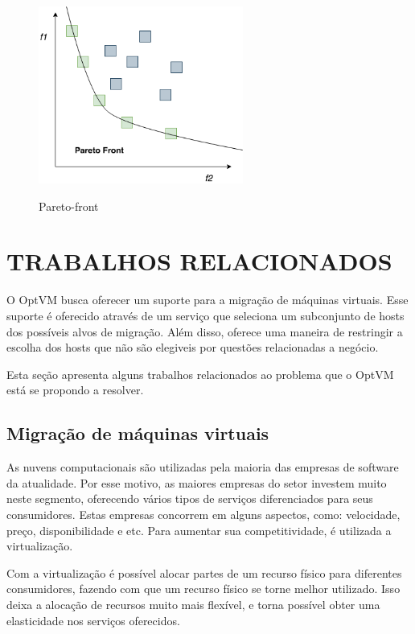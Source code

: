 \begin{figure}[!htb]
  \centering
  \caption{Pareto-front}
  \includegraphics[width=0.6\textwidth]{./dados/figuras/pareto-front.png}
  \label{fig:paretofront}
\end{figure}

\section{TRABALHOS RELACIONADOS}
O OptVM busca oferecer um suporte para a migração de máquinas virtuais. Esse
suporte é oferecido através de um serviço que seleciona um subconjunto de hosts 
dos possíveis alvos de migração. Além disso, oferece uma maneira de restringir
a escolha dos hosts que não são elegiveis por questões relacionadas a negócio.

Esta seção apresenta alguns trabalhos relacionados ao problema que o OptVM está
se propondo a resolver.

\subsection{Migração de máquinas virtuais}
As nuvens computacionais são utilizadas pela maioria das empresas de software da atualidade. 
Por esse motivo, as maiores empresas do setor investem muito neste segmento, 
oferecendo vários tipos de serviços diferenciados para seus consumidores. 
Estas empresas concorrem em alguns aspectos, como: velocidade, preço, disponibilidade e etc. 
Para aumentar sua competitividade, é utilizada a virtualização.

Com a virtualização é possível alocar partes de um recurso físico para diferentes consumidores, 
fazendo com que um recurso físico se torne melhor utilizado. Isso deixa a alocação de recursos
muito mais flexível, e torna possível obter uma elasticidade nos serviços oferecidos. 

